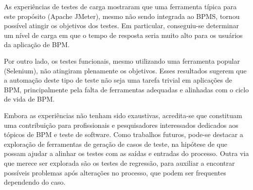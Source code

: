 \documentclass[12pt]{article}
\begin{document}
As experiências de testes de carga mostraram que uma ferramenta típica para este propósito (Apache JMeter), mesmo não sendo integrada ao BPMS, tornou possível atingir os objetivos dos testes. Em particular, conseguiu-se determinar um nível de carga em que o tempo de resposta seria muito alto para os usuários da aplicação de BPM.

Por outro lado, os testes funcionais, mesmo utilizando uma ferramenta popular (Selenium), não atingiram plenamente os objetivos. Esses resultados sugerem que a automação deste tipo de teste não seja uma tarefa trivial em aplicações de BPM, principalmente pela falta de ferramentas adequadas e alinhadas com o ciclo de vida de BPM.

Embora as experiências não tenham sido exaustivas, acredita-se que constituam uma contribuição para profissionais e pesquisadores interessados dedicados aos tópicos de BPM e teste de software. Como trabalhos futuros, pode-se destacar a exploração de ferramentas de geração de casos de teste, na hipótese de que possam ajudar a alinhar os testes com as saídas e entradas do processo. Outra via que merece ser explorada são os testes de regressão, para auxiliar a encontrar possíveis problemas após alterações no processo, que podem ser frequentes dependendo do caso.



\end{document}
